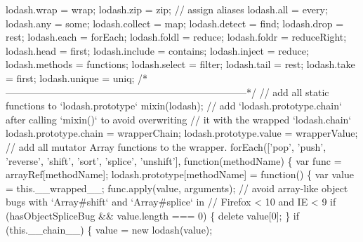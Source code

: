 \begin{DoxyCodeInclude}
{{\textcolor{stringliteral}{  lodash.wrap = wrap;}
\textcolor{stringliteral}{  lodash.zip = zip;}
\textcolor{stringliteral}{}
\textcolor{stringliteral}{  // assign aliases}
\textcolor{stringliteral}{  lodash.all = every;}
\textcolor{stringliteral}{  lodash.any = some;}
\textcolor{stringliteral}{  lodash.collect = map;}
\textcolor{stringliteral}{  lodash.detect = find;}
\textcolor{stringliteral}{  lodash.drop = rest;}
\textcolor{stringliteral}{  lodash.each = forEach;}
\textcolor{stringliteral}{  lodash.foldl = reduce;}
\textcolor{stringliteral}{  lodash.foldr = reduceRight;}
\textcolor{stringliteral}{  lodash.head = first;}
\textcolor{stringliteral}{  lodash.include = contains;}
\textcolor{stringliteral}{  lodash.inject = reduce;}
\textcolor{stringliteral}{  lodash.methods = functions;}
\textcolor{stringliteral}{  lodash.select = filter;}
\textcolor{stringliteral}{  lodash.tail = rest;}
\textcolor{stringliteral}{  lodash.take = first;}
\textcolor{stringliteral}{  lodash.unique = uniq;}
\textcolor{stringliteral}{}
\textcolor{stringliteral}{  /*--------------------------------------------------------------------------*/}
\textcolor{stringliteral}{}
\textcolor{stringliteral}{  // add all static functions to `lodash.prototype`}
\textcolor{stringliteral}{  mixin(lodash);}
\textcolor{stringliteral}{}
\textcolor{stringliteral}{  // add `lodash.prototype.chain` after calling `mixin()` to avoid overwriting}
\textcolor{stringliteral}{  // it with the wrapped `lodash.chain`}
\textcolor{stringliteral}{  lodash.prototype.chain = wrapperChain;}
\textcolor{stringliteral}{  lodash.prototype.value = wrapperValue;}
\textcolor{stringliteral}{}
\textcolor{stringliteral}{  // add all mutator Array functions to the wrapper.}
\textcolor{stringliteral}{  forEach(['pop', 'push', 'reverse', 'shift', 'sort', 'splice', 'unshift'], function(methodName) \{}
\textcolor{stringliteral}{    var func = arrayRef[methodName];}
\textcolor{stringliteral}{}
\textcolor{stringliteral}{    lodash.prototype[methodName] = function() \{}
\textcolor{stringliteral}{      var value = this.\_\_wrapped\_\_;}
\textcolor{stringliteral}{      func.apply(value, arguments);}
\textcolor{stringliteral}{}
\textcolor{stringliteral}{      // avoid array-like object bugs with `Array#shift` and `Array#splice` in}
\textcolor{stringliteral}{      // Firefox < 10 and IE < 9}
\textcolor{stringliteral}{      if (hasObjectSpliceBug && value.length === 0) \{}
\textcolor{stringliteral}{        delete value[0];}
\textcolor{stringliteral}{      \}}
\textcolor{stringliteral}{      if (this.\_\_chain\_\_) \{}
\textcolor{stringliteral}{        value = new lodash(value);}
}}
\end{DoxyCodeInclude}
